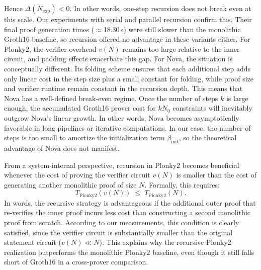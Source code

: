 Hence $\Delta(N_{\!\mathrm{exp}})<0$. In other words, one-step recursion does not break even at this scale. Our experiments with serial and parallel recursion confirm this. Their final proof generation times ($\approx$18.30\,s) were still slower than the monolithic Groth16 baseline, so recursion offered no advantage in these variants either. For Plonky2, the verifier overhead $v(N)$ remains too large relative to the inner circuit, and padding effects exacerbate this gap. For Nova, the situation is conceptually different. Its folding scheme ensures that each additional step adds only linear cost in the step size plus a small constant for folding, while proof size and verifier runtime remain constant in the recursion depth. This means that Nova has a well-defined break-even regime. Once the number of steps $k$ is large enough, the accumulated Groth16 prover cost for $kN_0$ constraints will inevitably outgrow Nova’s linear growth. In other words, Nova becomes asymptotically favorable in long pipelines or iterative computations. In our case, the number of steps is too small to amortize the initialization term $\beta_{\text{init}}$, so the theoretical advantage of Nova does not manifest.

From a system-internal perspective, recursion in Plonky2 becomes beneficial whenever the cost of proving the verifier circuit $v(N)$ is smaller than the cost of generating another monolithic proof of size $N$. Formally, this requires:
\[
T_{\text{Plonky2}}(v(N)) \;\le\; T_{\text{Plonky2}}(N).
\]
In words, the recursive strategy is advantageous if the additional outer proof that re-verifies the inner proof incurs less cost than constructing a second monolithic proof from scratch. According to our measurements, this condition is clearly satisfied, since the verifier circuit is substantially smaller than the original statement circuit ($v(N)\ll N$). This explains why the recursive Plonky2 realization outperforms the monolithic Plonky2 baseline, even though it still falls short of Groth16 in a cross-prover comparison.
